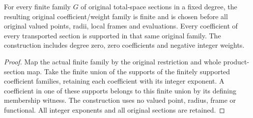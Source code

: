 \begin{theorem}\label{thm:native-tc-global-laurent-fixed-family}
\leanok
For every finite family $G$ of original total-space sections in a
fixed degree, the resulting original coefficient/weight family is
finite and is chosen before all original valued points, radii,
local frames and evaluations. Every coefficient of every transported
section is supported in that same original family. The construction
includes degree zero, zero coefficients and negative integer weights.
\end{theorem}
\begin{proof}
Map the actual finite family by the original restriction and whole
product-section map. Take the finite union of the supports of the
finitely supported coefficient families, retaining each coefficient
with its integer exponent. A coefficient in one of these supports
belongs to this finite union by its defining membership witness.
The construction uses no valued point, radius, frame or functional.
All integer exponents and all original sections are retained.
\end{proof}
